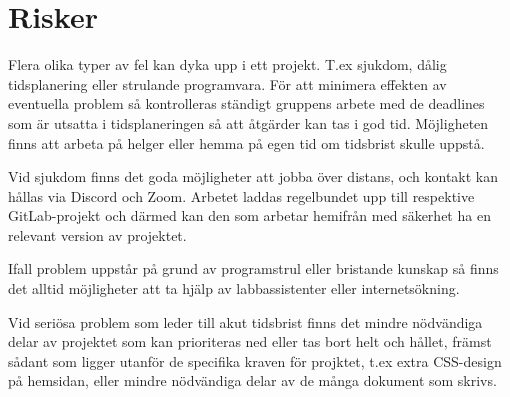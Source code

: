 \documentclass{TDP003mall}
\begin{document}
\section{Risker}
Flera olika typer av fel kan dyka upp i ett projekt. T.ex sjukdom, dålig tidsplanering eller strulande programvara. För att minimera effekten av eventuella problem så kontrolleras ständigt gruppens arbete med de deadlines som är utsatta i tidsplaneringen så att åtgärder kan tas i god tid. Möjligheten finns att arbeta på helger eller hemma på egen tid om tidsbrist skulle uppstå.

Vid sjukdom finns det goda möjligheter att jobba över distans, och kontakt kan hållas via Discord och Zoom. Arbetet laddas regelbundet upp till respektive GitLab-projekt och därmed kan den som arbetar hemifrån med säkerhet ha en relevant version av projektet.

Ifall problem uppstår på grund av programstrul eller bristande kunskap så finns det alltid möjligheter att ta hjälp av labbassistenter eller internetsökning. 

Vid seriösa problem som leder till akut tidsbrist finns det mindre nödvändiga delar av projektet som kan prioriteras ned eller tas bort helt och hållet, främst sådant som ligger utanför de specifika kraven för projktet, t.ex extra CSS-design på hemsidan, eller mindre nödvändiga delar av de många dokument som skrivs.
\end{document}
